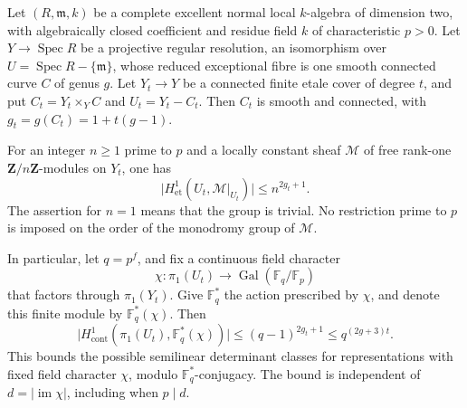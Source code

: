\begin{lemma}
\label{D:unramified-semilinear-determinant-budget}
Let $(R,\mathfrak m,k)$ be a complete excellent normal local
$k$-algebra of dimension two, with algebraically closed coefficient
and residue field $k$ of characteristic $p>0$. Let
$Y\to\operatorname{Spec}R$ be a projective regular resolution,
an isomorphism over $U=\operatorname{Spec}R-\{\mathfrak m\}$,
whose reduced exceptional fibre is one smooth connected curve $C$
of genus $g$. Let $Y_t\to Y$ be a connected finite etale cover
of degree $t$, and put $C_t=Y_t\times_Y C$ and $U_t=Y_t-C_t$.
Then $C_t$ is smooth and connected, with
$g_t=g(C_t)=1+t(g-1)$.

For an integer $n\geq1$ prime to $p$ and a locally constant
sheaf $\mathcal M$ of free rank-one $\mathbf Z/n\mathbf Z$-modules
on $Y_t$, one has
\[
 \bigl|H^1_{\mathrm{et}}(U_t,\mathcal M|_{U_t})\bigr|
       \leq n^{2g_t+1}.                                 \tag{D.SD.1}
\]
The assertion for $n=1$ means that the group is trivial.
No restriction prime to $p$ is imposed on the order of the
monodromy group of $\mathcal M$.

In particular, let $q=p^f$, and fix a continuous field character
\[
 \chi:\pi_1(U_t)\longrightarrow
             \operatorname{Gal}(\mathbb F_q/\mathbb F_p)
\]
that factors through $\pi_1(Y_t)$. Give $\mathbb F_q^*$ the
action prescribed by $\chi$, and denote this finite module by
$\mathbb F_q^*(\chi)$. Then
\[
 \bigl|H^1_{\mathrm{cont}}
       (\pi_1(U_t),\mathbb F_q^*(\chi))\bigr|
       \leq(q-1)^{2g_t+1}\leq q^{(2g+3)t}.               \tag{D.SD.2}
\]
This bounds the possible semilinear determinant classes for
representations with fixed field character $\chi$, modulo
$\mathbb F_q^*$-conjugacy. The bound is independent of
$d=|\operatorname{im}\chi|$, including when $p\mid d$.
\end{lemma}

